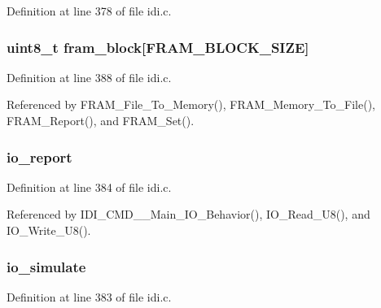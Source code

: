 Definition at line 378 of file idi.\+c.

\hypertarget{structidi__dataset_a4efa21fb4be298d529ae04ed2ca3466e}{
\subsubsection[{fram\+\_\+block}]{\setlength{\rightskip}{0pt plus 5cm}uint8\+\_\+t fram\+\_\+block\mbox{[}{\bf F\+R\+A\+M\+\_\+\+B\+L\+O\+C\+K\+\_\+\+S\+I\+Z\+E}\mbox{]}}}\label{structidi__dataset_a4efa21fb4be298d529ae04ed2ca3466e}


Definition at line 388 of file idi.\+c.



Referenced by F\+R\+A\+M\+\_\+\+File\+\_\+\+To\+\_\+\+Memory(), F\+R\+A\+M\+\_\+\+Memory\+\_\+\+To\+\_\+\+File(), F\+R\+A\+M\+\_\+\+Report(), and F\+R\+A\+M\+\_\+\+Set().

\hypertarget{structidi__dataset_ad5d4eafc81d2a1f443f9a5a09b56efe0}{
\subsubsection[{io\+\_\+report}]{ io\+\_\+report}}\label{structidi__dataset_ad5d4eafc81d2a1f443f9a5a09b56efe0}


Definition at line 384 of file idi.\+c.



Referenced by I\+D\+I\+\_\+\+C\+M\+D\+\_\+\+\_\+\+Main\+\_\+\+I\+O\+\_\+\+Behavior(), I\+O\+\_\+\+Read\+\_\+\+U8(), and I\+O\+\_\+\+Write\+\_\+\+U8().

\hypertarget{structidi__dataset_a6513343c81785c28903fc3c4d1d50206}{
\subsubsection[{io\+\_\+simulate}]{ io\+\_\+simulate}}\label{structidi__dataset_a6513343c81785c28903fc3c4d1d50206}


Definition at line 383 of file idi.\+c.



